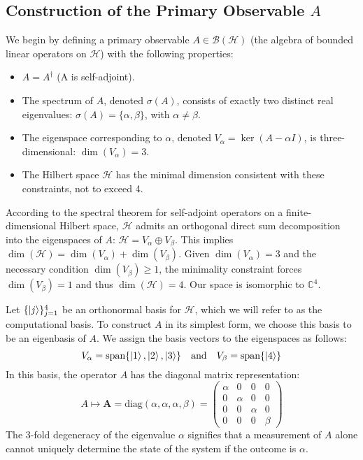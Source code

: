 \documentclass[11pt,a4paper]{article}
\begin{document}
\subsection{Construction of the Primary Observable \texorpdfstring{$A$}{A}}
We begin by defining a primary observable $A \in \mathcal{B}(\mathcal{H})$ (the
algebra of bounded linear operators on $\mathcal{H}$) with the following
properties:
\begin{itemize}
  \item $A = A^\dagger$ (A is self-adjoint).
  \item The spectrum of $A$, denoted $\sigma(A)$, consists of exactly two
    distinct real eigenvalues: $\sigma(A) = \{\alpha, \beta\}$, with $\alpha
    \neq \beta$.
  \item The eigenspace corresponding to $\alpha$, denoted $V_\alpha = \ker(A -
    \alpha I)$, is three-dimensional: $\dim(V_\alpha) = 3$.
  \item The Hilbert space $\mathcal{H}$ has the minimal dimension consistent
    with these constraints, not to exceed 4.
\end{itemize}
According to the spectral theorem for self-adjoint operators on a
finite-dimensional Hilbert space, $\mathcal{H}$ admits an orthogonal direct sum
decomposition into the eigenspaces of $A$: $\mathcal{H} = V_\alpha \oplus
V_\beta$. This implies $\dim(\mathcal{H}) = \dim(V_\alpha) + \dim(V_\beta)$.
Given $\dim(V_\alpha)=3$ and the necessary condition $\dim(V_\beta) \ge 1$, the
minimality constraint forces $\dim(V_\beta)=1$ and thus $\dim(\mathcal{H})=4$.
Our space is isomorphic to $\mathbb{C}^4$.

Let $\{\ket{j}\}_{j=1}^4$ be an orthonormal basis for $\mathcal{H}$, which we
will refer to as the computational basis. To construct $A$ in its simplest form,
we choose this basis to be an eigenbasis of $A$. We assign the basis vectors to
the eigenspaces as follows:
$$ V_\alpha = \text{span}\{\ket{1}, \ket{2}, \ket{3}\} \quad \text{and} \quad
V_\beta = \text{span}\{\ket{4}\} $$
In this basis, the operator $A$ has the diagonal matrix representation:
$$
A \mapsto \mathbf{A} = \text{diag}(\alpha, \alpha, \alpha, \beta) =
\begin{pmatrix}
  \alpha & 0 & 0 & 0 \\
  0 & \alpha & 0 & 0 \\
  0 & 0 & \alpha & 0 \\
  0 & 0 & 0 & \beta
\end{pmatrix}
$$
The 3-fold degeneracy of the eigenvalue $\alpha$ signifies that a measurement of
$A$ alone cannot uniquely determine the state of the system if the outcome is
$\alpha$.
\end{document}
